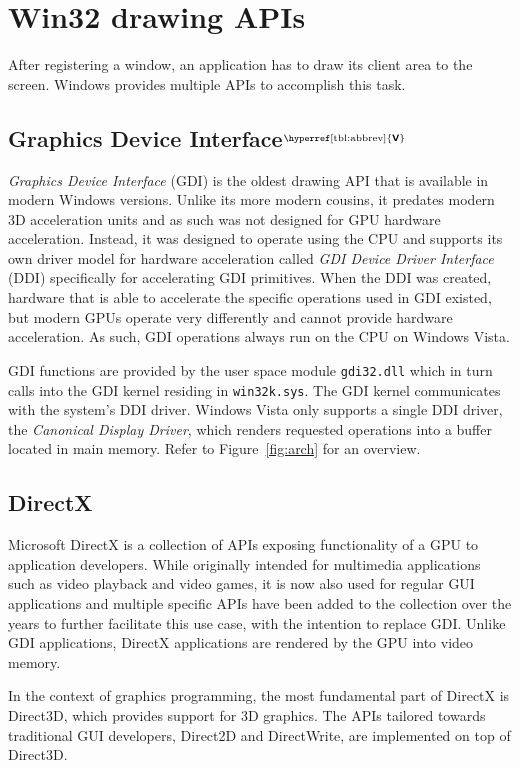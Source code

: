 \documentclass[10pt,twocolumn,a4paper]{article}
\newcommand{\bs}[1]{\textbf{\sffamily #1}}
\newcommand{\winver}[1]{$^{\text{\hyperref[tbl:abbrev]{\bs{#1}}}}$}
\newcommand{\winsubsection}[2]{\subsection[#1]{#1\winver{#2}}}
\begin{document}
	\section{Win32 drawing APIs}
		After registering a window, an application has to draw its client area
		to the screen. Windows provides multiple APIs to accomplish this task.

		\winsubsection{Graphics Device Interface}{V} \label{sec:gdi}
			\textit{Graphics Device Interface} (GDI) is the oldest drawing API
			that is available in modern Windows versions. Unlike its more
			modern cousins, it predates modern 3D acceleration units and as such
			was not designed for GPU hardware acceleration. Instead, it was
			designed to operate using the CPU and supports its own driver model
			for hardware acceleration called \textit{GDI Device Driver
			Interface} (DDI) specifically for accelerating GDI
			primitives. When the DDI was created, hardware that is able to
			accelerate the specific operations used in GDI existed, but modern GPUs operate
			very differently and cannot provide hardware acceleration. As such,
			GDI operations always run on the CPU on Windows Vista. \cite{d2dvsgdi}

			GDI functions are provided by the user space module
			\texttt{gdi32.dll} which in turn calls into the GDI kernel residing
			in \texttt{win32k.sys}. The GDI kernel communicates with the
			system's DDI driver. Windows Vista only supports a single DDI driver,
			the \textit{Canonical Display Driver}, which renders requested operations
			into a buffer located in main memory. Refer to Figure~\ref{fig:arch}
			for an overview. \cite{d2dvsgdi, dwmredirect}

		\subsection{DirectX}
			Microsoft DirectX is a collection of APIs exposing functionality of
			a GPU to application developers. While originally intended for
			multimedia applications such as video playback and video games, it
			is now also used for regular GUI applications and multiple specific
			APIs have been added to the collection over the years to further
			facilitate this use case, with the intention to replace GDI.
			Unlike GDI applications, DirectX applications
			are rendered by the GPU into video memory. \cite{d2dvsgdi,aboutd2d}

			In the context of graphics programming, the most fundamental part of
			DirectX is Direct3D, which provides support for 3D graphics. The
			APIs tailored towards traditional GUI developers, Direct2D and
			DirectWrite, are implemented on top of Direct3D. \cite{aboutd2d}
\end{document}
